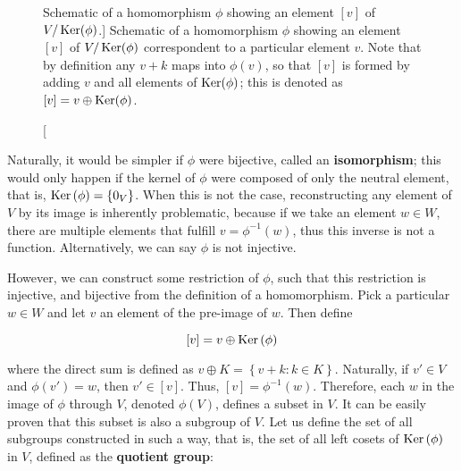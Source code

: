\begin{figure}[h]
\caption
[{Schematic of a homomorphism $\phi$ showing an element $[v]$ of $V/\operatorname{Ker}(\phi)$.}]
{{Schematic of a homomorphism $\phi$ showing an element $[v]$ of $V/\operatorname{Ker}(\phi)$ correspondent to a particular element $v$. Note that by definition any $v + k$ maps into $\phi(v)$, so that $[v]$ is formed by adding $v$ and all elements of $\operatorname{Ker}(\phi)$; this is denoted as $[v] = v\oplus\operatorname{Ker}(\phi)$.}}
\label{fig:group_homo}
\end{figure} %

	Naturally, it would be simpler if $\phi$ were bijective, called an \textbf{isomorphism}; this would only happen if the kernel of $\phi$ were composed of only the neutral element, that is, $\operatorname{Ker}\left(\phi\right) = \left\{0_V\right\}$. When this is not the case, reconstructing any element of $V$ by its image is inherently problematic, because if we take an element $w\in W$, there are multiple elements that fulfill $v = \phi^{-1}\left(w\right)$, thus this inverse is not a function. Alternatively, we can say $\phi$ is not injective.

	However, we can construct some restriction of $\phi$, such that this restriction is injective, and bijective from the definition of a homomorphism. Pick a particular $w\in W$ and let $v$ an element of the pre-image of $w$. Then define

\begin{equation} \left[v\right] = v \oplus \operatorname{Ker}\left(\phi\right) \end{equation}

	\noindent where the direct sum is defined as $v \oplus K = \left\{v + k: k\in K\right\}$. Naturally, if $v'\in V$ and $\phi\left(v'\right) = w$, then $v'\in\left[v\right]$. Thus, $\left[v\right] = \phi^{-1}\left(w\right)$. Therefore, each $w$ in the image of $\phi$ through $V$, denoted $\phi\left(V\right)$, defines a subset in $V$. It can be easily proven that this subset is also a subgroup of $V$. Let us define the set of all subgroups constructed in such a way, that is, the set of all left cosets of $\operatorname{Ker}\left(\phi\right)$ in $V$, defined as the \textbf{quotient group}:

